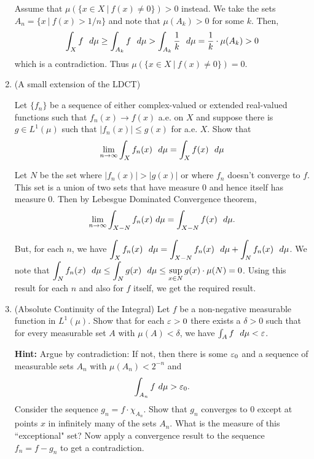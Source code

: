 \documentclass[12pt]{article}
\begin{document}
\begin{enumerate}
    \begin{mybox}
        Assume that $\mu(\{x \in X \ | \ f(x) \neq 0 \}) > 0$ instead.
        We take the sets $A_n = \{x \ | \ f(x) > 1/n\}$ and note that
        $\mu(A_k)>0$ for some $k$. Then,
        $$\int_X{f\ \dmu}\geq \int_{A_k}{f\ \dmu}>\int_{A_k}{\frac{1}{k}\ \dmu}
        =\frac{1}{k}\cdot\mu(A_k)>0$$
        which is a contradiction. Thus $\mu(\{x \in X \ | \ f(x) \neq 0 \}) = 0$.
    \end{mybox}
    
    \item (A small extension of the LDCT) 
    
    Let $\{f_n\}$ be a sequence of either complex-valued or extended real-valued functions such that $f_n(x) \to f(x)$ a.e. on $X$ and suppose there is $g \in L^1(\mu)$ such that $|f_n(x)| \leq g(x)$ for a.e. $X$. Show that
    $$\lim_{n \to \infty} \int_X f_n(x)\ \ d\mu = \int_X f(x)\ \ d\mu$$ 
    
    \begin{mybox}
        Let $N$ be the set where $|f_n(x)|>|g(x)|$ or where $f_n$ doesn't converge
        to $f$. This set is a union of two sets that have measure 0 and hence 
        itself has measure 0. Then by Lebesgue Dominated Convergence theorem,
        $$\lim_{n \to \infty} \int_{X-N} f_n(x) \ d\mu = \int_{X-N} f(x)\ \ d\mu.$$
        
        But, for each $n$, we have $\displaystyle\int_{X}{f_n(x)\ \ d\mu}=\int_{X-N}
        {f_n(x)\ \ d\mu}+\int_{N}{f_n(x)\ \ d\mu}$. We note that
        $\ds\int_{N}{f_n(x)\ \dmu}\leq\int_{N}{g(x)\ \dmu}\leq\sup_{x\in N}
        {g(x)}\cdot\mu(N)=0$. Using this result for each $n$ and also for
        $f$ itself, we get the required result.
    \end{mybox}
    
    \item (Absolute Continuity of the Integral) Let $f$ be a  non-negative measurable function in $L^1(\mu)$. Show that for each $\varepsilon > 0$ there exists a $\delta>0$ such that for every measurable set $A$ with $\mu(A) < \delta$, we have $\int_A f\ \ d\mu  < \varepsilon$. 
    
    {\bf Hint:} Argue by contradiction: If not, then there is some $\varepsilon_0$ and a sequence of measurable sets $A_n$ with $\mu(A_n) < 2^{-n}$ and 
    $$ \int_{A_n} f \ d\mu > \varepsilon_0.$$ 
    Consider the sequence $g_n = f \cdot \chi_{A_n}$. Show that $g_n$ converges to 0 except at points $x$ in infinitely many of the sets $A_n$. What is the measure of this ``exceptional" set? Now apply a convergence result to the sequence $f_n = f - g_n$ to get a contradiction. 
    

\end{enumerate}
\end{document}
